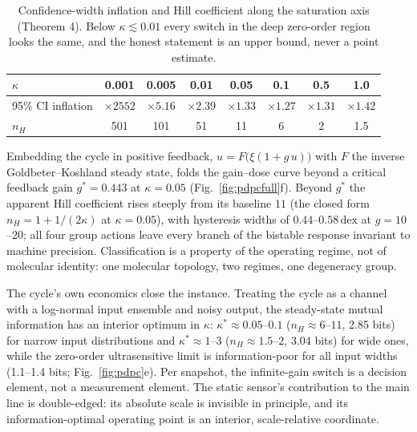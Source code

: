 \documentclass[11pt,a4paper]{article}
\newcommand{\dex}{\ensuremath{\,\mathrm{dex}}}
\begin{document}
\begin{table}[t]
\centering
\caption{Confidence-width inflation and Hill coefficient along the saturation axis (Theorem 4). Below $\kappa\lesssim0.01$ every switch in the deep zero-order region looks the same, and the honest statement is an upper bound, never a point estimate.}
\label{tab:onesided}
\small
\begin{tabular}{@{}lccccccc@{}}
\toprule
$\kappa$ & 0.001 & 0.005 & 0.01 & 0.05 & 0.1 & 0.5 & 1.0 \\
\midrule
95\% CI inflation & $\times2552$ & $\times5.16$ & $\times2.39$ & $\times1.33$ & $\times1.27$ & $\times1.31$ & $\times1.42$ \\
$n_H$ & 501 & 101 & 51 & 11 & 6 & 2 & 1.5 \\
\bottomrule
\end{tabular}
\end{table}

Embedding the cycle in positive feedback, $u=F\big(\xi(1+g\,u)\big)$ with $F$ the inverse Goldbeter--Koshland steady state, folds the gain--dose curve beyond a critical feedback gain $g^*=0.443$ at $\kappa=0.05$ (Fig.~\ref{fig:pdpcfull}f). Beyond $g^*$ the apparent Hill coefficient rises steeply from its baseline $11$ (the closed form $n_H=1+1/(2\kappa)$ at $\kappa=0.05$), with hysteresis widths of $0.44$--$0.58\dex$ at $g=10$--$20$; all four group actions leave every branch of the bistable response invariant to machine precision. Classification is a property of the operating regime, not of molecular identity: one molecular topology, two regimes, one degeneracy group.

The cycle's own economics close the instance. Treating the cycle as a channel with a log-normal input ensemble and noisy output, the steady-state mutual information has an interior optimum in $\kappa$: $\kappa^*\approx0.05$--$0.1$ ($n_H\approx6$--$11$, 2.85 bits) for narrow input distributions and $\kappa^*\approx1$--$3$ ($n_H\approx1.5$--$2$, 3.04 bits) for wide ones, while the zero-order ultrasensitive limit is information-poor for all input widths (1.1--1.4 bits; Fig.~\ref{fig:pdpc}e). Per snapshot, the infinite-gain switch is a decision element, not a measurement element. The static sensor's contribution to the main line is double-edged: its absolute scale is invisible in principle, and its information-optimal operating point is an interior, scale-relative coordinate.
\end{document}
